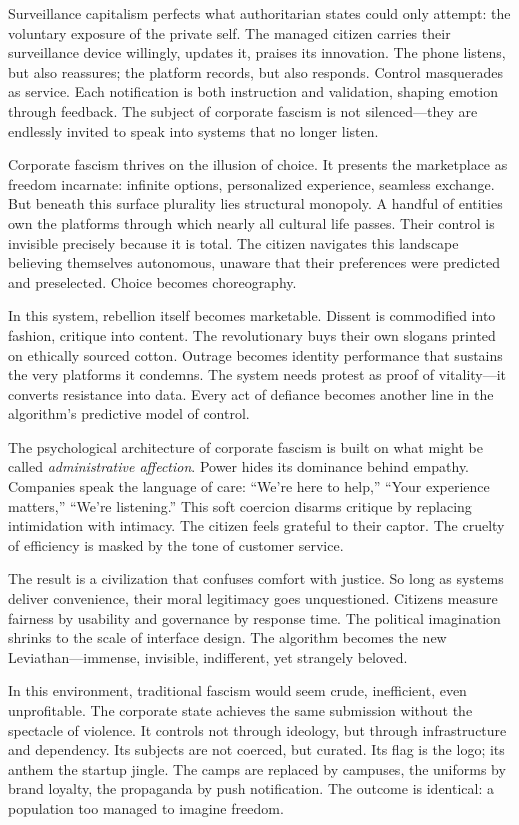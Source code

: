 \documentclass[11pt,twoside]{book}
\begin{document}
Surveillance capitalism perfects what authoritarian states could only attempt: the voluntary exposure of the private self.  The managed citizen carries their surveillance device willingly, updates it, praises its innovation.  The phone listens, but also reassures; the platform records, but also responds.  Control masquerades as service.  Each notification is both instruction and validation, shaping emotion through feedback.  The subject of corporate fascism is not silenced—they are endlessly invited to speak into systems that no longer listen.

Corporate fascism thrives on the illusion of choice.  It presents the marketplace as freedom incarnate: infinite options, personalized experience, seamless exchange.  But beneath this surface plurality lies structural monopoly.  A handful of entities own the platforms through which nearly all cultural life passes.  Their control is invisible precisely because it is total.  The citizen navigates this landscape believing themselves autonomous, unaware that their preferences were predicted and preselected.  Choice becomes choreography.

In this system, rebellion itself becomes marketable.  Dissent is commodified into fashion, critique into content.  The revolutionary buys their own slogans printed on ethically sourced cotton.  Outrage becomes identity performance that sustains the very platforms it condemns.  The system needs protest as proof of vitality—it converts resistance into data.  Every act of defiance becomes another line in the algorithm’s predictive model of control.

The psychological architecture of corporate fascism is built on what might be called \emph{administrative affection}.  Power hides its dominance behind empathy.  Companies speak the language of care: “We’re here to help,” “Your experience matters,” “We’re listening.”  This soft coercion disarms critique by replacing intimidation with intimacy.  The citizen feels grateful to their captor.  The cruelty of efficiency is masked by the tone of customer service.

The result is a civilization that confuses comfort with justice.  So long as systems deliver convenience, their moral legitimacy goes unquestioned.  Citizens measure fairness by usability and governance by response time.  The political imagination shrinks to the scale of interface design.  The algorithm becomes the new Leviathan—immense, invisible, indifferent, yet strangely beloved.

In this environment, traditional fascism would seem crude, inefficient, even unprofitable.  The corporate state achieves the same submission without the spectacle of violence.  It controls not through ideology, but through infrastructure and dependency.  Its subjects are not coerced, but curated.  Its flag is the logo; its anthem the startup jingle.  The camps are replaced by campuses, the uniforms by brand loyalty, the propaganda by push notification.  The outcome is identical: a population too managed to imagine freedom.
\end{document}

